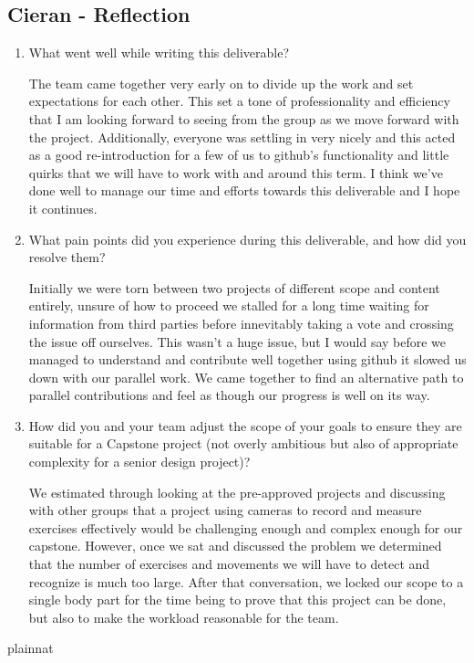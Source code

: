 \documentclass{article}
\begin{document}
\subsection*{Cieran - Reflection}
\begin{enumerate}
    \item What went well while writing this deliverable? 

    The team came together very early on to divide up the work and set expectations for each other. This set a tone of
    professionality and efficiency that I am looking forward to seeing from the group as we move forward with the project.
    Additionally, everyone was settling in very nicely and this acted as a good re-introduction for a few of us to github's
    functionality and little quirks that we will have to work with and around this term. I think we've done well to manage
    our time and efforts towards this deliverable and I hope it continues.

    \item What pain points did you experience during this deliverable, and how
    did you resolve them?

    Initially we were torn between two projects of different scope and content entirely, unsure of how to proceed we
    stalled for a long time waiting for information from third parties before innevitably taking a vote and crossing the
    issue off ourselves. This wasn't a huge issue, but I would say before we managed to understand and contribute well together
    using github it slowed us down with our parallel work. We came together to find an alternative path to parallel contributions
    and feel as though our progress is well on its way.

    \item How did you and your team adjust the scope of your goals to ensure
    they are suitable for a Capstone project (not overly ambitious but also of
    appropriate complexity for a senior design project)?
    
    We estimated through looking at the pre-approved projects and discussing with other groups that a project using cameras to
    record and measure exercises effectively would be challenging enough and complex enough for our capstone. However, once we
    sat and discussed the problem we determined that the number of exercises and movements we will have to detect and recognize
    is much too large. After that conversation, we locked our scope to a single body part for the time being to prove that this
    project can be done, but also to make the workload reasonable for the team.
    
\end{enumerate}  

 {plainnat}

\end{document}
